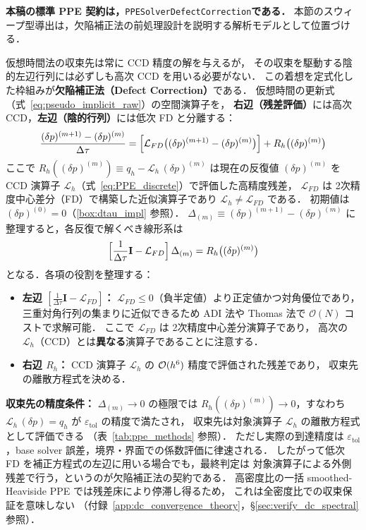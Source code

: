 \noindent\textbf{本稿の標準 PPE 契約は，}\texttt{PPESolverDefectCorrection}\textbf{である．}
本節のスウィープ型導出は，欠陥補正法の前処理設計を説明する解析モデルとして位置づける．

仮想時間法の収束先は常に CCD 精度の解を与えるが，
その収束を駆動する陰的左辺行列には必ずしも高次 CCD を用いる必要がない．
この着想を定式化した枠組みが\textbf{欠陥補正法（Defect Correction）}である．
仮想時間の更新式（式~\eqref{eq:pseudo_implicit_raw}）の空間演算子を，
\textbf{右辺（残差評価）}には高次 CCD，\textbf{左辺（陰的行列）}には低次 FD と分離する：
\begin{equation}
  \frac{(\delta p)^{(m+1)}-(\delta p)^{(m)}}{\Delta\tau}
  = \Bigl[\mathcal{L}_{FD}\bigl((\delta p)^{(m+1)}-(\delta p)^{(m)}\bigr)\Bigr]
    + R_h\bigl((\delta p)^{(m)}\bigr)
  \label{eq:defect_correction_split}
\end{equation}
ここで $R_h((\delta p)^{(m)}) \equiv q_h - \mathcal{L}_h\,(\delta p)^{(m)}$ は現在の反復値 $(\delta p)^{(m)}$
を CCD 演算子 $\mathcal{L}_h$（式~\eqref{eq:PPE_discrete}）で評価した高精度残差，
$\mathcal{L}_{FD}$ は 2次精度中心差分（FD）で構築した近似演算子であり $\mathcal{L}_h \neq \mathcal{L}_{FD}$ である．
初期値は $(\delta p)^{(0)} = 0$（\ref{box:dtau_impl} 参照）．
$\Delta_{(m)} \equiv (\delta p)^{(m+1)}-(\delta p)^{(m)}$ に整理すると，各反復で解くべき線形系は
\begin{equation}
  \Bigl[\frac{1}{\Delta\tau}\mathbf{I} - \mathcal{L}_{FD}\Bigr]\,\Delta_{(m)}
  = R_h\bigl((\delta p)^{(m)}\bigr)
  \label{eq:defect_correction_linear}
\end{equation}
となる．各項の役割を整理する：
\begin{itemize}
  \item \textbf{左辺 $[\frac{1}{\Delta\tau}\mathbf{I} - \mathcal{L}_{FD}]$：}
        $\mathcal{L}_{FD} \le 0$（負半定値）より正定値かつ対角優位であり，
        三重対角行列の集まりに近似できるため ADI 法や
        Thomas 法で $\mathcal{O}(N)$ コストで求解可能．
        ここで $\mathcal{L}_{FD}$ は 2次精度中心差分演算子であり，
        高次の $\mathcal{L}_h$（CCD）とは\textbf{異なる}演算子であることに注意する．
  \item \textbf{右辺 $R_h$：} CCD 演算子 $\mathcal{L}_h$ の $\mathcal{O}(h^6)$ 精度で評価された残差であり，
        収束先の離散方程式を決める．
\end{itemize}

\textbf{収束先の精度条件：}
$\Delta_{(m)} \to 0$ の極限では $R_h((\delta p)^{(m)}) \to 0$，すなわち
$\mathcal{L}_h\,(\delta p) = q_h$ が $\varepsilon_\mathrm{tol}$ の精度で満たされ，
収束先は対象演算子 $\mathcal{L}_h$ の離散方程式として評価できる
（表~\ref{tab:ppe_methods} 参照）．
ただし実際の到達精度は $\varepsilon_\mathrm{tol}$，base solver 誤差，境界・界面での係数評価に律速される．
したがって低次 FD を補正方程式の左辺に用いる場合でも，最終判定は
対象演算子による外側残差で行う，というのが欠陥補正法の契約である．
高密度比の一括 smoothed-Heaviside PPE では残差床により停滞し得るため，
これは全密度比での収束保証を意味しない
（付録~\ref{app:dc_convergence_theory}，§\ref{sec:verify_dc_spectral} 参照）．

